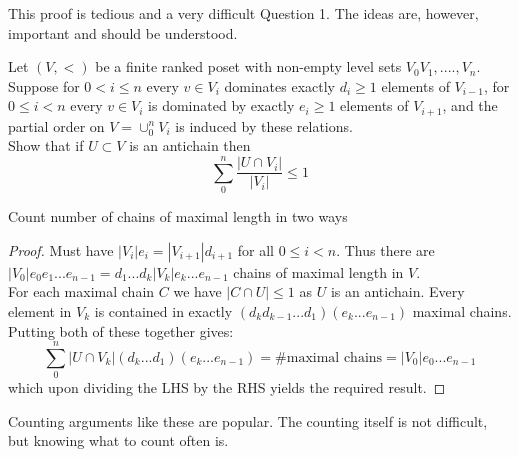 \documentclass[a4paper]{article}
\begin{document}
	\begin{remark}
	This proof is tedious and a very difficult Question 1. The ideas are, however, important and should be understood.
	\end{remark}
	
	\begin{question}[Question 2]
	Let $(V, <)$ be a finite ranked poset with non-empty level sets $V_0 V_1,....,V_n$. Suppose for $0 < i \leq n$ every $v \in V_i$ dominates exactly $d_i \geq 1$ elements of $V_{i-1}$, for $0 \leq i < n$ every $v \in V_i$ is dominated by exactly $e_i \geq 1$ elements of $V_{i+1}$, and the partial order on $V = \cup_0^n V_i$ is induced by these relations.\\
	Show that if $U \subset V$ is an antichain then
	\[\sum_0^n{\frac{|U \cap V_i|}{|V_i|}} \leq 1\]
	\end{question}
	\begin{idea}
	Count number of chains of maximal length in two ways
	\end{idea}
	\begin{proof}
	Must have $|V_i|e_i = |V_{i+1}|d_{i+1}$ for all $0 \leq i < n$. Thus there are $|V_0| e_0 e_1 ... e_{n-1} = d_1 ... d_k |V_k|e_k ... e_{n-1}$ chains of maximal length in $V$.\\
	For each maximal chain $C$ we have $|C \cap U| \leq 1$ as $U$ is an antichain. Every element in $V_k$ is contained in exactly $(d_k d_{k-1} ... d_1)(e_k ... e_{n-1})$ maximal chains.\\
	Putting both of these together gives:
	\[\sum_0^n | U \cap V_k | (d_k ... d_ 1)(e_k ... e_{n-1}) = \# \text{maximal chains} = |V_0|e_0 ... e_{n-1}\]
	which upon dividing the LHS by the RHS yields the required result.
	
	\end{proof}
	\begin{remark}
	Counting arguments like these are popular. The counting itself is not difficult, but knowing what to count often is.
	\end{remark}
\end{document}
